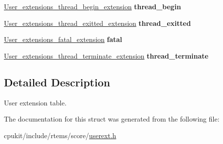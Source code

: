\begin{DoxyCompactItemize}
\item 
\mbox{\label{structUser__extensions__Table_ac97b0ed91b09f1e7180597c3efbfaa8a}} 
\mbox{\hyperlink{group__RTEMSScoreUserExt_ga4beea4d5417558969b343317683ab7c6}{User\+\_\+extensions\+\_\+thread\+\_\+begin\+\_\+extension}} {\bfseries thread\+\_\+begin}
\item 
\mbox{\label{structUser__extensions__Table_a82ca15fd777fe0792f4631ba7a21fb7e}} 
\mbox{\hyperlink{group__RTEMSScoreUserExt_ga876d6c2dd2ba0083ea94332a9438a91b}{User\+\_\+extensions\+\_\+thread\+\_\+exitted\+\_\+extension}} {\bfseries thread\+\_\+exitted}
\item 
\mbox{\label{structUser__extensions__Table_ae65d6c4e47d0e1107f120166ceb926dd}} 
\mbox{\hyperlink{group__RTEMSScoreUserExt_gab9b016d654a82fef8666c465c2736a05}{User\+\_\+extensions\+\_\+fatal\+\_\+extension}} {\bfseries fatal}
\item 
\mbox{\label{structUser__extensions__Table_a4e15848fbfd282c2a6ed8df28360188c}} 
\mbox{\hyperlink{group__RTEMSScoreUserExt_gab2e511a997080ca8050ac25a3bece8e4}{User\+\_\+extensions\+\_\+thread\+\_\+terminate\+\_\+extension}} {\bfseries thread\+\_\+terminate}
\end{DoxyCompactItemize}


\subsection{Detailed Description}
User extension table. 

The documentation for this struct was generated from the following file\+:\begin{DoxyCompactItemize}
\item 
cpukit/include/rtems/score/\mbox{\hyperlink{userext_8h}{userext.\+h}}\end{DoxyCompactItemize}
